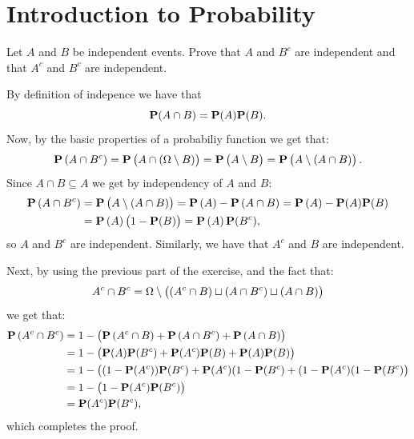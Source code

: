 \documentclass[11pt,a4paper]{article}
\begin{document}
\maketitle


\newpage
\tableofcontents
\newpage

\section{Introduction to Probability}

\begin{exercise}
  Let $A$ and $B$ be independent events.
  Prove that $A$ and $B^c$
  are independent and that $A^c$ and $B^c$ are independent.
\end{exercise}
\begin{solution}
  By definition of indepence we have that
  \[
    \mathbf{P}(A \cap B) = \mathbf{P}(A) \mathbf{P}(B).
  \]
  Now, by the basic properties of a probabiliy function we get that:
  \[
    \Prob\del{A \cap B^c} =
    \Prob\del{A \cap (\Omega \setminus B)} =
    \Prob\del{A \setminus B} =
    \Prob\del{A \setminus (A \cap B)}.
  \]
  Since $A \cap B \subseteq A$ we get by independency of $A$ and $B$:
  \begin{align*}
    \Prob\del{A \cap B^c} &=
    \Prob\del{A \setminus (A \cap B)} =
    \Prob\del{A} - \Prob\del{A \cap B} =
    \Prob\del{A} - \Prob(A) \Prob(B) \\ &=
    \Prob\del{A} \del{1 - \Prob(B)} =
    \Prob\del{A} \Prob(B^c),
  \end{align*}
  so $A$ and $B^c$ are independent.
  Similarly, we have that $A^c$ and $B$ are independent.
  
  Next, by using the previous part of the exercise,
  and the fact that:
  \[
    A^c \cap B^c =
    \Omega \setminus \del{(A^c \cap B) \sqcup (A \cap B^c) \sqcup (A \cap B)}
  \]
  we get that:
  \begin{align*}
    \Prob\del{A^c \cap B^c} &=
    1 - \del{\Prob\del{A^c \cap B} + \Prob\del{A \cap B^c} + \Prob\del{A \cap B}} \\ &=
    1 - \del{\Prob(A) \Prob(B^c) + \Prob(A^c) \Prob(B) + \Prob(A) \Prob(B)} \\ &=
    1 - \del{(1 - \Prob(A^c)) \Prob(B^c) + \Prob(A^c) (1 - \Prob(B^c) +
      (1 - \Prob(A^c) (1 - \Prob(B^c)} \\ &=
    1 - \del{1 - \Prob(A^c) \Prob(B^c)} \\ &=
    \Prob(A^c) \Prob(B^c),
  \end{align*}
  which completes the proof.
\end{solution}
\end{document}
